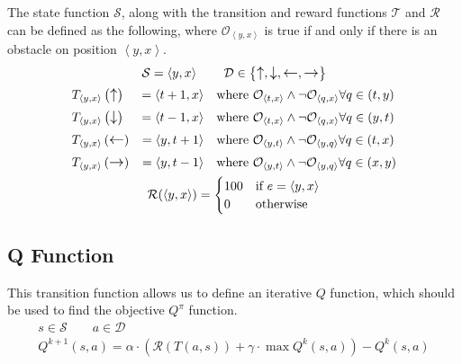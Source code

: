 \newcommand{\coor}[2]{\left\langle #1, #2 \right\rangle}
\newcommand{\yx}{\coor{y}{x}}
\newcommand{\obs}{\mathcal{O}}
\newcommand{\state}{\mathcal{S}}
\newcommand{\reward}{\mathcal{R}}
The state function $\state$, along with the transition and reward functions $\mathcal{T}$ and $\reward$ can be defined as the following, where $\obs_{\yx}$ is true if and only if there is an obstacle on position $\yx$.
\begin{gather*}
	\state = \yx \qquad \mathcal{D} \in \left\{ \upa, \downa, \lefta, \righta \right\} \\
	\begin{aligned}
		&T_{\yx}\left(\upa\right) &= \coor{t + 1}{x} &&&\text{where } \obs_{\coor{t}{x}} \wedge \neg \obs_{\coor{q}{x}} \forall q \in \left(t, y\right) \\
		&T_{\yx}\left(\downa\right) &= \coor{t - 1}{x} &&&\text{where } \obs_{\coor{t}{x}} \wedge \neg \obs_{\coor{q}{x}} \forall q \in \left(y, t\right) \\
		&T_{\yx}\left(\lefta\right) &= \coor{y}{t + 1} &&&\text{where } \obs_{\coor{y}{t}} \wedge \neg \obs_{\coor{y}{q}} \forall q \in \left(t, x\right) \\
		&T_{\yx}\left(\righta\right) &= \coor{y}{t - 1} &&&\text{where } \obs_{\coor{y}{t}} \wedge \neg \obs_{\coor{y}{q}} \forall q \in \left(x, y\right)
	\end{aligned} \\
	\reward(\yx) = \begin{cases}
		100 & \text{if } e = \yx \\
		0 & \text{otherwise}
	\end{cases}
\end{gather*}

\subsection{Q Function}

This transition function allows us to define an iterative $Q$ function, which should be used to find the objective $Q^\pi$ function.
\begin{gather*}
	s \in \mathcal{S} \qquad a \in \mathcal{D} \\
	Q^{k + 1}(s, a) = \alpha \cdot \left( \reward( T( a, s ) ) + \gamma \cdot \max{Q^k(s, a)} \right) - Q^k(s, a)
\end{gather*}

